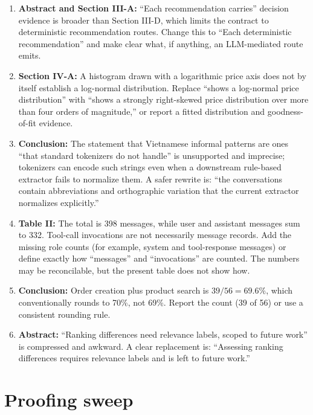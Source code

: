 \documentclass[11pt]{article}
\begin{document}
\begin{enumerate}
  \item \textbf{Abstract and Section III-A:} ``Each recommendation carries'' decision evidence is broader than Section III-D, which limits the contract to deterministic recommendation routes.  Change this to ``Each deterministic recommendation'' and make clear what, if anything, an LLM-mediated route emits.

  \item \textbf{Section IV-A:} A histogram drawn with a logarithmic price axis does not by itself establish a log-normal distribution.  Replace ``shows a log-normal price distribution'' with ``shows a strongly right-skewed price distribution over more than four orders of magnitude,'' or report a fitted distribution and goodness-of-fit evidence.

  \item \textbf{Conclusion:} The statement that Vietnamese informal patterns are ones ``that standard tokenizers do not handle'' is unsupported and imprecise; tokenizers can encode such strings even when a downstream rule-based extractor fails to normalize them.  A safer rewrite is: ``the conversations contain abbreviations and orthographic variation that the current extractor normalizes explicitly.''

  \item \textbf{Table II:} The total is 398 messages, while user and assistant messages sum to 332.  Tool-call invocations are not necessarily message records.  Add the missing role counts (for example, system and tool-response messages) or define exactly how ``messages'' and ``invocations'' are counted.  The numbers may be reconcilable, but the present table does not show how.

  \item \textbf{Conclusion:} Order creation plus product search is $39/56=69.6\%$, which conventionally rounds to 70\%, not 69\%.  Report the count (39 of 56) or use a consistent rounding rule.

  \item \textbf{Abstract:} ``Ranking differences need relevance labels, scoped to future work'' is compressed and awkward.  A clear replacement is: ``Assessing ranking differences requires relevance labels and is left to future work.''
\end{enumerate}

\section*{Proofing sweep}
\end{document}
